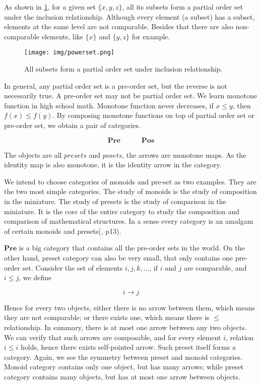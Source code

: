 \documentclass{article}
\begin{document}
As shown in \ref{fig:powerset}, for a given set $\{x, y, z\}$, all its subsets form a partial order set under the inclusion relationship. Although every element (a subset) has a subset, elements at the same level are not comparable. Besides that there are also non-comparable elements, like $\{x\}$ and $\{y, z\}$ for example.

\begin{figure}[htbp]
 \centering
 \texttt{[image: img/powerset.png]}
 \caption{All subsets form a partial order set under inclusion relationship.}
 \label{fig:powerset}
\end{figure}

 
In general, any partial order set is a pre-order set, but the reverse is not necessarily true. A pre-order set may not be partial order set. We learn monotone function in high school math. Monotone function never decreases, if $x \leq y$, then $f(x) \leq f(y)$. By composing monotone functions on top of partial order set or pre-order set, we obtain a pair of categories.

\[
\pmb{Pre} \quad \quad \quad \pmb{Pos}
\]

The objects are all $presets$ and $posets$, the arrows are monotone maps. As the identity map is also monotone, it is the identity arrow in the category.

We intend to choose categories of monoids and pre-set as two examples. They are the two most simple categories. The study of monoids is the study of composition in the miniature. The study of presets is the study of comparison in the miniature. It is the core of the entire category to study the composition and comparison of mathematical structures. In a sense every category is an amalgam of certain monoids and presets(\cite{Simmons2011}, p13).

$\pmb{Pre}$ is a big category that contains all the pre-order sets in the world. On the other hand, preset category can also be very small, that only contains one pre-order set. Consider the set of elements $i, j, k, ...$, if $i$ and $j$ are comparable, and $i \leq j$, we define

\[
i \longrightarrow j
\]

Hence for every two objects, either there is no arrow between them, which means they are not comparable; or there exists one, which means there is $\leq$ relationship. In summary, there is at most one arrow between any two objects. We can verify that such arrows are composable, and for every element $i$, relation $i \leq i$ holds, hence there exists self-pointed arrow. Such preset itself forms a category. Again, we see the symmetry between preset and monoid categories. Monoid category contains only one object, but has many arrows; while preset category contains many objects, but has at most one arrow between objects.
\end{document}
